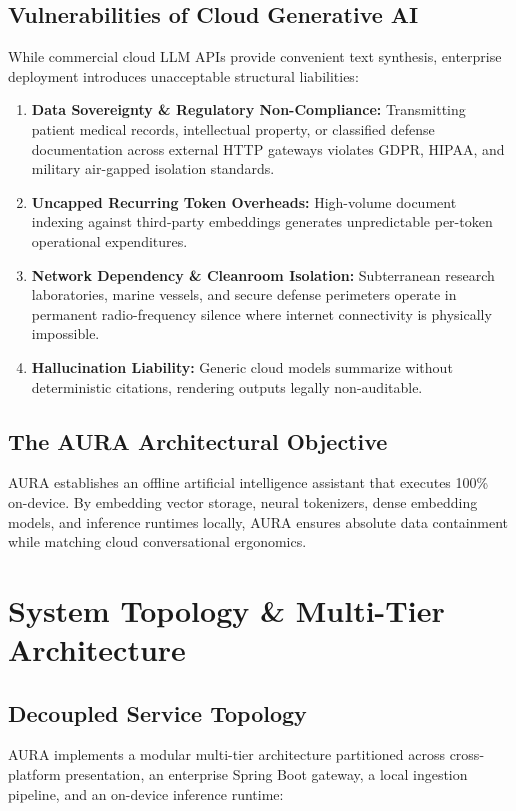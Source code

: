 \documentclass[12pt,a4paper]{report}
\begin{document}
\section{Vulnerabilities of Cloud Generative AI}
While commercial cloud LLM APIs provide convenient text synthesis, enterprise deployment introduces unacceptable structural liabilities:
\begin{enumerate}[nosep]
    \item \textbf{Data Sovereignty \& Regulatory Non-Compliance:} Transmitting patient medical records, intellectual property, or classified defense documentation across external HTTP gateways violates GDPR, HIPAA, and military air-gapped isolation standards.
    \item \textbf{Uncapped Recurring Token Overheads:} High-volume document indexing against third-party embeddings generates unpredictable per-token operational expenditures.
    \item \textbf{Network Dependency \& Cleanroom Isolation:} Subterranean research laboratories, marine vessels, and secure defense perimeters operate in permanent radio-frequency silence where internet connectivity is physically impossible.
    \item \textbf{Hallucination Liability:} Generic cloud models summarize without deterministic citations, rendering outputs legally non-auditable.
\end{enumerate}

\section{The AURA Architectural Objective}
AURA establishes an offline artificial intelligence assistant that executes 100\% on-device. By embedding vector storage, neural tokenizers, dense embedding models, and inference runtimes locally, AURA ensures absolute data containment while matching cloud conversational ergonomics.

\chapter{System Topology \& Multi-Tier Architecture}

\section{Decoupled Service Topology}
AURA implements a modular multi-tier architecture partitioned across cross-platform presentation, an enterprise Spring Boot gateway, a local ingestion pipeline, and an on-device inference runtime:
\end{document}
